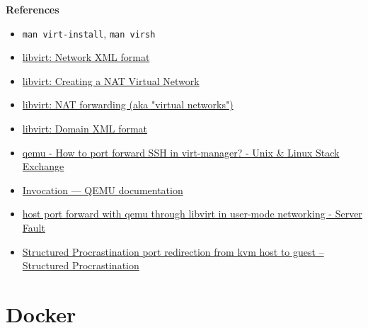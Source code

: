 \documentclass[12pt, a4paper]{article}
\begin{document}
  \textbf{References}
  \begin{itemize}
    \item \verb|man virt-install|, \verb|man virsh|
      \item \href{https://libvirt.org/formatnetwork.html}{libvirt: Network XML format}
      \item \href{https://wiki.libvirt.org/TaskNATSetupVirtManager.html}{libvirt: Creating a NAT Virtual Network}
      \item \href{https://wiki.libvirt.org/Networking.html#host-configuration-nat}{libvirt: NAT forwarding (aka "virtual networks")}
      \item \href{https://libvirt.org/formatdomain.html}{libvirt: Domain XML format}
      \item \href{https://unix.stackexchange.com/questions/350339/how-to-port-forward-ssh-in-virt-manager}{qemu - How to port forward SSH in virt-manager? - Unix \& Linux Stack Exchange}
      \item \href{https://www.qemu.org/docs/master/system/invocation.html}{Invocation — QEMU  documentation}
      \item \href{https://serverfault.com/questions/890520/host-port-forward-with-qemu-through-libvirt-in-user-mode-networking}{host port forward with qemu through libvirt in user-mode networking - Server Fault}
      \item \href{https://blog.adamspiers.org/2012/01/23/port-redirection-from-kvm-host-to-guest/}{Structured Procrastination port redirection from kvm host to guest – Structured Procrastination}
  \end{itemize}

  \pagebreak
  \section*{Docker}
\end{document}

